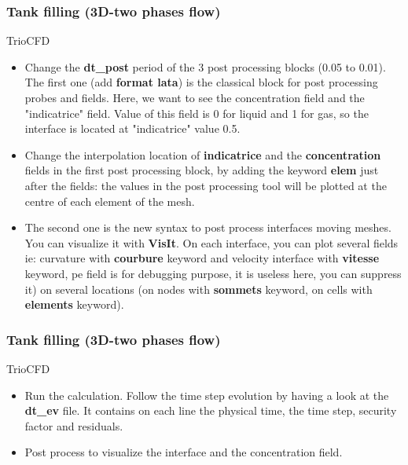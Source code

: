 \documentclass[10pt]{beamer}
\begin{document}
\begin{frame}
\frametitle{Tank filling (3D-two phases flow)}
\begin{block}{TrioCFD}

\begin{itemize}
\item Change the \textbf{dt\_post} period of the 3 post processing blocks (0.05 to 0.01). The first one (add \textbf{format lata}) is the classical block for post processing probes and fields. Here, we want to see the concentration field and the "indicatrice" field. Value of this field is 0 for liquid and 1 for gas, so the interface is located at "indicatrice" value 0.5.

\item Change the interpolation location of \textbf{indicatrice} and the \textbf{concentration} fields in the first post processing block, by adding the keyword \textbf{elem} just after the fields: the values in the post processing tool will be plotted at the centre of each element of the mesh.

\item The second one is the new syntax to post process interfaces moving meshes. You can visualize it with \textbf{VisIt}. On each interface, you can plot several fields ie: curvature with \textbf{courbure} keyword and velocity interface with \textbf{vitesse} keyword, pe field is for debugging purpose, it is useless here, you can suppress it) on several locations (on nodes with \textbf{sommets} keyword, on cells with \textbf{elements} keyword).
\end{itemize}

\end{block}
\end{frame}
\begin{frame}
\frametitle{Tank filling (3D-two phases flow)}
\begin{block}{TrioCFD}

\begin{itemize}
\item Run the calculation. Follow the time step evolution by having a look at the \textbf{dt\_ev} file. It contains on each line the physical time, the time step, security factor and residuals.

\item Post process to visualize the interface and the concentration field.
\end{itemize}

\end{block}
\end{frame}
\end{document}
